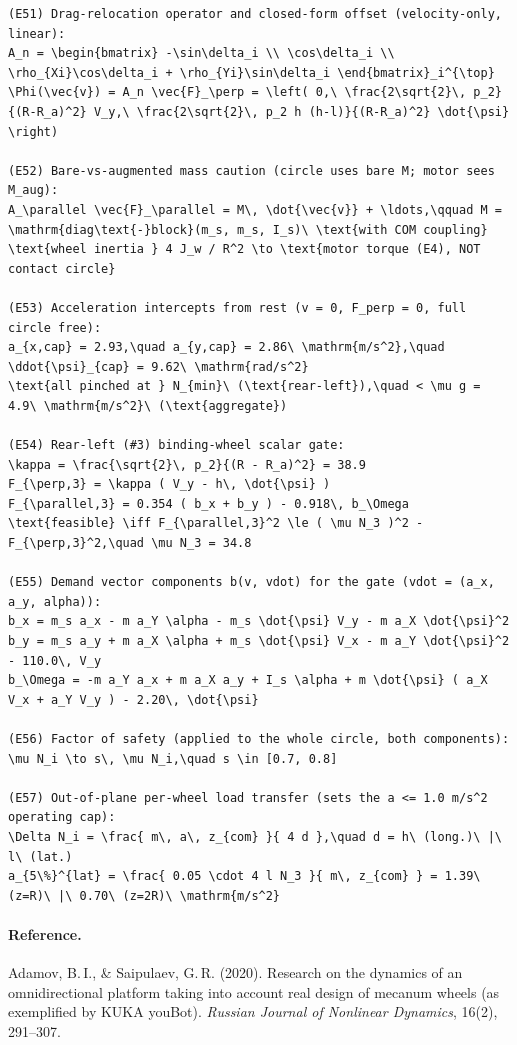 \documentclass[11pt]{article}
\begin{document}
\begin{lstlisting}
(E51) Drag-relocation operator and closed-form offset (velocity-only, linear):
A_n = \begin{bmatrix} -\sin\delta_i \\ \cos\delta_i \\ \rho_{Xi}\cos\delta_i + \rho_{Yi}\sin\delta_i \end{bmatrix}_i^{\top}
\Phi(\vec{v}) = A_n \vec{F}_\perp = \left( 0,\ \frac{2\sqrt{2}\, p_2}{(R-R_a)^2} V_y,\ \frac{2\sqrt{2}\, p_2 h (h-l)}{(R-R_a)^2} \dot{\psi} \right)

(E52) Bare-vs-augmented mass caution (circle uses bare M; motor sees M_aug):
A_\parallel \vec{F}_\parallel = M\, \dot{\vec{v}} + \ldots,\qquad M = \mathrm{diag\text{-}block}(m_s, m_s, I_s)\ \text{with COM coupling}
\text{wheel inertia } 4 J_w / R^2 \to \text{motor torque (E4), NOT contact circle}

(E53) Acceleration intercepts from rest (v = 0, F_perp = 0, full circle free):
a_{x,cap} = 2.93,\quad a_{y,cap} = 2.86\ \mathrm{m/s^2},\quad \ddot{\psi}_{cap} = 9.62\ \mathrm{rad/s^2}
\text{all pinched at } N_{min}\ (\text{rear-left}),\quad < \mu g = 4.9\ \mathrm{m/s^2}\ (\text{aggregate})

(E54) Rear-left (#3) binding-wheel scalar gate:
\kappa = \frac{\sqrt{2}\, p_2}{(R - R_a)^2} = 38.9
F_{\perp,3} = \kappa ( V_y - h\, \dot{\psi} )
F_{\parallel,3} = 0.354 ( b_x + b_y ) - 0.918\, b_\Omega
\text{feasible} \iff F_{\parallel,3}^2 \le ( \mu N_3 )^2 - F_{\perp,3}^2,\quad \mu N_3 = 34.8

(E55) Demand vector components b(v, vdot) for the gate (vdot = (a_x, a_y, alpha)):
b_x = m_s a_x - m a_Y \alpha - m_s \dot{\psi} V_y - m a_X \dot{\psi}^2
b_y = m_s a_y + m a_X \alpha + m_s \dot{\psi} V_x - m a_Y \dot{\psi}^2 - 110.0\, V_y
b_\Omega = -m a_Y a_x + m a_X a_y + I_s \alpha + m \dot{\psi} ( a_X V_x + a_Y V_y ) - 2.20\, \dot{\psi}

(E56) Factor of safety (applied to the whole circle, both components):
\mu N_i \to s\, \mu N_i,\quad s \in [0.7, 0.8]

(E57) Out-of-plane per-wheel load transfer (sets the a <= 1.0 m/s^2 operating cap):
\Delta N_i = \frac{ m\, a\, z_{com} }{ 4 d },\quad d = h\ (long.)\ |\ l\ (lat.)
a_{5\%}^{lat} = \frac{ 0.05 \cdot 4 l N_3 }{ m\, z_{com} } = 1.39\ (z=R)\ |\ 0.70\ (z=2R)\ \mathrm{m/s^2}
\end{lstlisting}

\paragraph{Reference.}
Adamov, B.\,I., \& Saipulaev, G.\,R. (2020). Research on the dynamics of an omnidirectional
platform taking into account real design of mecanum wheels (as exemplified by KUKA youBot).
\emph{Russian Journal of Nonlinear Dynamics}, 16(2), 291--307.
\end{document}
